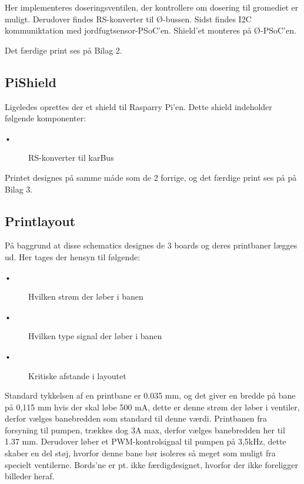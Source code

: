 Her implementeres doseringsventilen, der kontrollere om dosering til gromediet er muligt. Derudover findes RS-konverter til Ø-bussen. Sidst findes I2C kommuniktation med jordfugtsensor-PSoC'en. 
Shield'et monteres på Ø-PSoC'en.

Det færdige print ses på Bilag 2.


\subsection{PiShield}

Ligeledes oprettes der et shield til Rasparry Pi'en. Dette shield indeholder følgende komponenter: 

\begin{description}
 \item[•] RS-konverter til karBus
\end{description}

Printet designes på samme måde som de 2 forrige, og det færdige print ses på på Bilag 3.


\subsection{Printlayout}
På baggrund at disse schematics designes de 3 boards og deres printbaner lægges ud. Her tages der hensyn til følgende: 

\begin{description}
 \item[•] Hvilken strøm der løber i banen
 \item[•] Hvilken type signal der løber i banen
 \item[•] Kritiske afstande i layoutet
\end{description}

Standard tykkelsen af en printbane er 0.035 mm, og det giver en bredde på bane på 0,115 mm hvis der skal løbe 500 mA, dette er denne strøm der løber i ventiler, derfor vælges banebredden som standard til denne værdi. 
Printbanen fra forsyning til pumpen, trækkes dog 3A max, derfor vælges banebredden her til 1.37 mm. \newline
Derudover løber et PWM-kontrolsignal til pumpen på 3,5kHz, dette skaber en del støj, hvorfor denne bane bør isoleres så meget som muligt fra specielt ventilerne.\newline
Bords'ne er pt. ikke færdigdesignet, hvorfor der ikke foreligger billeder heraf. 
 